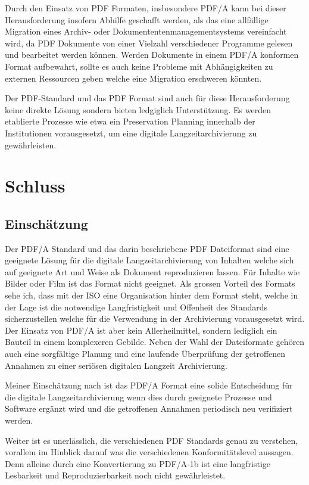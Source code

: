 \documentclass[a4paper,oneside, 12pt]{report}
\begin{document}
Durch den Einsatz von PDF Formaten, insbesondere PDF/A kann bei dieser Herausforderung insofern Abhilfe geschafft werden, als das eine allfällige Migration eines Archiv- oder Dokumententenmanagementsystems vereinfacht wird, da PDF Dokumente von einer Vielzahl verschiedener Programme gelesen und bearbeitet werden können. Werden Dokumente in einem PDF/A konformen Format aufbewahrt, sollte es auch keine Probleme mit Abhängigkeiten zu externen Ressourcen geben welche eine Migration erschweren könnten.

Der PDF-Standard und das PDF Format sind auch für diese Herausforderung keine direkte Lösung sondern bieten ledgiglich Unterstützung. Es werden etablierte Prozesse wie etwa ein Preservation Planning innerhalb der Institutionen vorausgesetzt, um eine digitale Langzeitarchivierung zu gewährleisten. \cite{pdfaorgsponsored}


\chapter{Schluss}\label{sec:schluss}
\section{Einschätzung}
Der PDF/A Standard und das darin beschriebene PDF Dateiformat sind eine geeignete Lösung für die digitale Langzeitarchivierung von Inhalten welche sich auf geeignete Art und Weise als Dokument reproduzieren lassen. Für Inhalte wie Bilder oder Film ist das Format nicht geeignet. Als grossen Vorteil des Formats sehe ich, dass mit der \ac{ISO} eine Organisation hinter dem Format steht, welche in der Lage ist die notwendige Langfristigkeit und Offenheit des Standards sicherzustellen welche für die Verwendung in der Archivierung vorausgesetzt wird. Der Einsatz von PDF/A ist aber kein Allerheilmittel, sondern lediglich ein Bauteil in einem komplexeren Gebilde. Neben der Wahl der Dateiformate gehören auch eine sorgfältige Planung und eine laufende Überprüfung der getroffenen Annahmen zu einer seriösen digitalen Langzeit Archivierung. 

Meiner Einschätzung nach ist das PDF/A Format eine solide Entscheidung für die digitale Langzeitarchivierung wenn dies durch geeignete Prozesse und Software ergänzt wird und die getroffenen Annahmen periodisch neu verifiziert werden. 

Weiter ist es unerlässlich, die verschiedenen PDF Standards genau zu verstehen, vorallem im Hinblick darauf was die verschiedenen Konformitätslevel aussagen. Denn alleine durch eine Konvertierung zu PDF/A-1b ist eine langfristige Lesbarkeit und Reproduzierbarkeit noch nicht gewährleistet.
\end{document}
